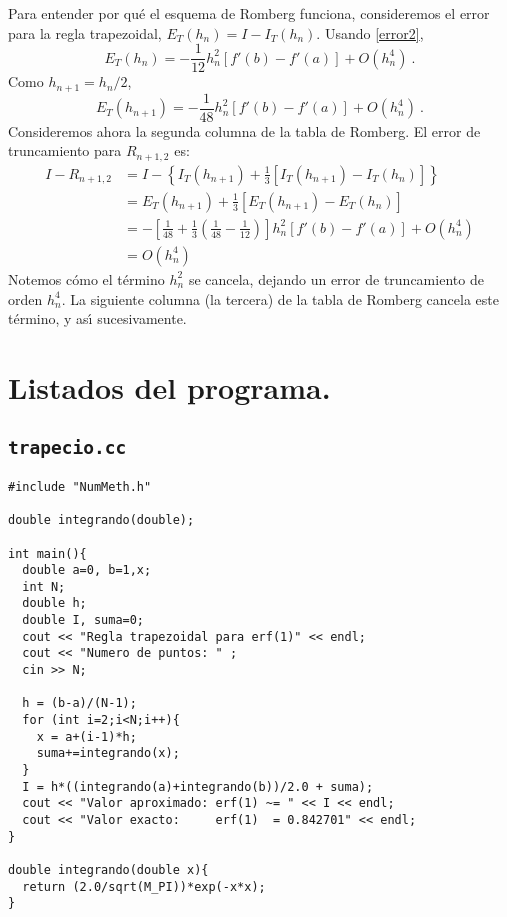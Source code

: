 \documentclass[12pt]{article}
\begin{document}
\vspace{.3cm}
Para entender por qu\'e el esquema de Romberg funciona, consideremos el
error para la regla trapezoidal, $E_T(h_n) = I-I_T(h_n)$. Usando
\eqref{error2}, 
\begin{equation*}
  E_T(h_n) = -\frac 1{12} h^2_n [f'(b) - f'(a)] + O(h_n^4) \ . 
\end{equation*}
Como $h_{n+1} = h_n/2$,
\begin{equation*}
  E_T(h_{n+1}) = -\frac 1{48} h^2_n [f'(b)-f'(a)]+O(h_n^4) \ . 
\end{equation*}
Consideremos ahora la segunda columna de la tabla de Romberg. El error
de truncamiento para $R_{n+1,2}$ es:
\begin{align*}
  I-R_{n+1,2} &= I - \left\{
    I_T(h_{n+1})+\frac13[I_T(h_{n+1})-I_T(h_n)]\right\} \\
&=E_T(h_{n+1})+\frac 13[E_T(h_{n+1})-E_T(h_n)]\\
&=-\left[\frac 1{48} + \frac 13 \left(\frac 1{48} - \frac 1{12}\right)
  \right] h_n^2 [f'(b)-f'(a)]+O(h_n^4) \\
&=O(h_n^4)
\end{align*}
Notemos c\'omo el t\'ermino $h_n^2$ se cancela, dejando un error de
truncamiento de orden $h_n^4$. La siguiente columna (la tercera) de la
tabla de Romberg cancela este t\'ermino, y as\'{\i} sucesivamente. 

\section{Listados del programa.}

\subsection{\tt trapecio.cc}
\begin{verbatim}
#include "NumMeth.h"

double integrando(double);

int main(){
  double a=0, b=1,x;
  int N;
  double h;
  double I, suma=0;
  cout << "Regla trapezoidal para erf(1)" << endl;
  cout << "Numero de puntos: " ;
  cin >> N;
  
  h = (b-a)/(N-1);
  for (int i=2;i<N;i++){
    x = a+(i-1)*h;
    suma+=integrando(x);
  }
  I = h*((integrando(a)+integrando(b))/2.0 + suma);
  cout << "Valor aproximado: erf(1) ~= " << I << endl;
  cout << "Valor exacto:     erf(1)  = 0.842701" << endl;
}

double integrando(double x){
  return (2.0/sqrt(M_PI))*exp(-x*x);
}
  
\end{verbatim}
\end{document}
